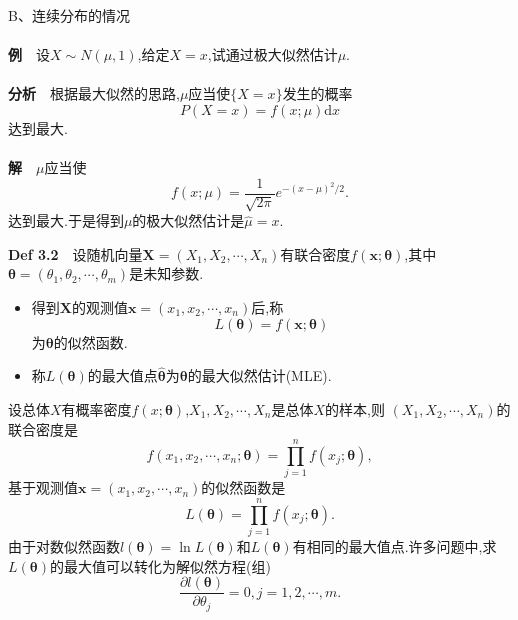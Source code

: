 	\begin{frame}
		B、连续分布的情况
		\\ \hspace*{\fill} \\%
		\textbf{例}$\quad$设$X\sim N(\mu,1)$,给定$X=x$,试通过极大似然估计$\mu$.
		\\ \hspace*{\fill} \\%
		\textbf{分析}$\quad$根据最大似然的思路,$\mu$应当使$\{X=x\}$发生的概率
		\begin{equation}
			P(X=x) = f(x;\mu)\mathrm{d}x
		\end{equation}
		达到最大.
		\\ \hspace*{\fill} \\%
		\textbf{解}$\quad$$\mu$应当使
		\begin{equation}
			f(x;\mu) = \frac{1}{\sqrt{2\pi}}e^{-(x-\mu)^2/2}.
		\end{equation}
		达到最大.于是得到$\mu$的极大似然估计是$\widehat{\mu} = x$.
		
	\end{frame}

	\begin{frame}
		\begin{block}{\textbf{Def 3.2}$\quad$设随机向量$\bm{X} = (X_1,X_2,\cdots,X_n)$有联合密度$f(\bm{x};\bm{\theta})$,其中$\bm{\theta} = (\theta_1,\theta_2,\cdots,\theta_m)$是未知参数.}
			\begin{itemize}
				\item 得到$\bm{X}$的观测值$\bm{x} = (x_1,x_2,\cdots,x_n)$后,称\begin{equation}
				L(\bm{\theta}) = f(\bm{x};\bm{\theta})
				\end{equation}
				为$\bm{\theta}$的\alert{似然函数}.
				\item 称$L(\bm{\theta})$的最大值点$\widehat{\bm{\theta}}$为$\bm{\theta}$的\alert{最大似然估计}(MLE).
			\end{itemize}
		\end{block}
	\end{frame}

	\begin{frame}
		设总体$X$有概率密度$f(x;\bm{\theta})$,$X_1,X_2,\cdots,X_n$是总体$X$的样本,则
		$(X_1,X_2,\cdots,X_n)$的联合密度是
		\begin{equation}
			f(x_1,x_2,\cdots,x_n;\bm{\theta}) = \prod_{j=1}^{n}f(x_j;\bm{\theta}),
		\end{equation}
		基于观测值$\bm{x} = (x_1,x_2,\cdots,x_n)$的似然函数是
		\begin{equation}
			L(\bm{\theta}) = \prod_{j=1}^{n}f(x_j;\bm{\theta}).
		\end{equation}
		由于对数似然函数$l(\bm{\theta}) = \ln L(\bm{\theta})$和$L(\bm{\theta})$有相同的最大值点.许多问题中,求$L(\bm{\theta})$的最大值可以转化为解似然方程(组)
		\begin{equation}
			\frac{\partial l(\bm{\theta})}{\partial \theta_j} = 0,j = 1,2,\cdots,m.
		\end{equation}
	\end{frame}

